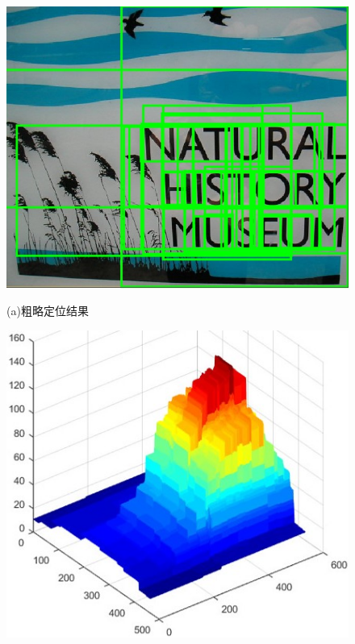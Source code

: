         \begin{figure}[!h]
        \begin{minipage}[t]{0.37\linewidth}
        \centering
        \includegraphics[width=\textwidth]{./figures/c4_img.jpg}
        \centerline{\small (a)粗略定位结果}
        \end{minipage}
        \begin{minipage}[t]{0.35\linewidth}
        \centering
        \includegraphics[width=\textwidth]{./figures/c4_static_skeleton_response.jpg}

\end{minipage}
\end{figure}
